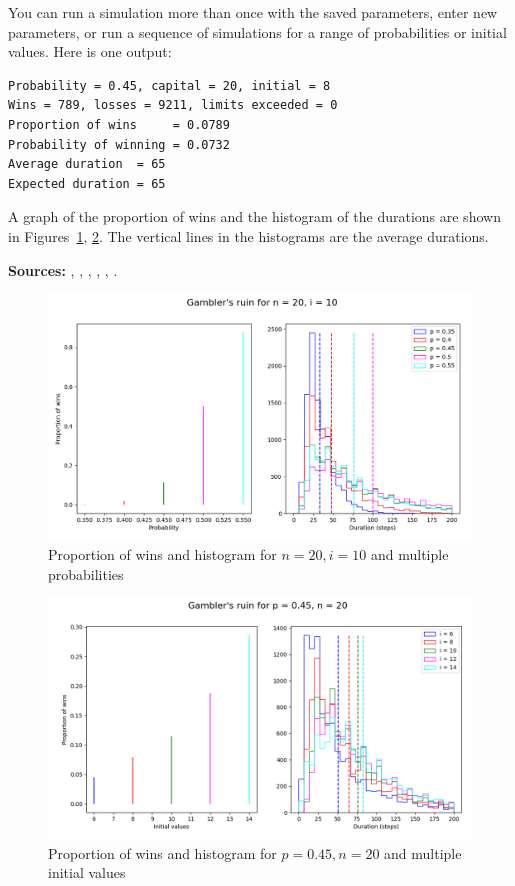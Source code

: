 \documentclass[11pt,a4paper]{article}
\begin{document}
You can run a simulation more than once with the saved parameters, enter new parameters, or run a sequence of simulations for a range of probabilities or initial values. Here is one output:
\begin{verbatim}
Probability = 0.45, capital = 20, initial = 8
Wins = 789, losses = 9211, limits exceeded = 0
Proportion of wins     = 0.0789
Probability of winning = 0.0732
Average duration  = 65
Expected duration = 65
\end{verbatim}
A graph of the proportion of wins and the histogram of the durations are shown in Figures~\ref{f.gambler-hist1}, \ref{f.gambler-hist2}. The vertical lines in the histograms are the average durations.

\textbf{Sources:} \cite[Chapter 2]{privault}, \cite[Problems 35, 36]{mosteller,mos}, \cite[Example 4m]{ross}, \cite[Example 2.7.3]{BW}, \cite[Section~16.16]{border}, \cite[Section~20.1]{mit-mcs}.

\begin{figure}
\begin{center}
\includegraphics[width=\textwidth]{gamblers-ruin-01}
\caption{Proportion of wins and histogram for $n=20, i=10$ and multiple probabilities}\label{f.gambler-hist1}
\end{center}
\end{figure}

\begin{figure}
\begin{center}
\includegraphics[width=\textwidth]{gamblers-ruin-02}
\caption{Proportion of wins and histogram for $p=0.45, n=20$ and multiple initial values}\label{f.gambler-hist2}
\end{center}
\end{figure}
\end{document}
